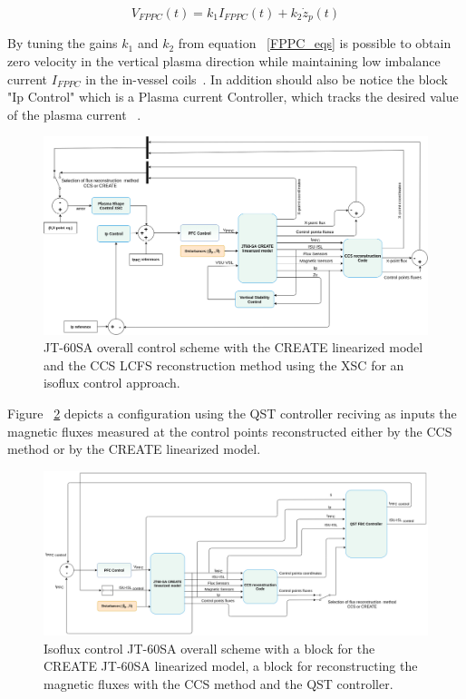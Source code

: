  \begin{equation}
 V_{FPPC}(t)=k_1I_{FPPC}(t)+ k_2\dot{z}_p(t)
 \label{FPPC_eqs}
 \end{equation}   
 
 By tuning the gains $k_1$ and $k_2$ from equation ~\ref{FPPC_eqs} is possible to obtain zero velocity in the vertical plasma direction while maintaining low imbalance current $  I_{FPPC} $ in the in-vessel coils~\cite[Sec.~4.1]{NCruz}.  In addition should also be notice the block "Ip Control" which is a Plasma current Controller, which tracks the desired value of the plasma current ~\cite{de2014shape}.

 
 
\begin{figure}
	\centering
	\includegraphics[width=1.05\textwidth]{Chp3/JT60Schemes1.png}
	\caption{	\label{JT60controlscheme}JT-60SA overall control scheme with the CREATE linearized model and the CCS LCFS reconstruction method  using the XSC for an isoflux control approach.}
\end{figure}

Figure ~\ref{JT60FBCcheme} depicts a configuration using the QST controller reciving as inputs the magnetic fluxes measured at the control points reconstructed either by the CCS method or by the CREATE linearized model.
\smallskip
 
\begin{figure}
	\centering
	\includegraphics[width=1.05\textwidth]{Chp3/JT60SchemeFBCnew.png}
	\caption{	\label{JT60FBCcheme} Isoflux control JT-60SA overall scheme with  a block for the  CREATE JT-60SA linearized model, a block for reconstructing  the magnetic fluxes with the CCS method and the QST controller. }
\end{figure}



